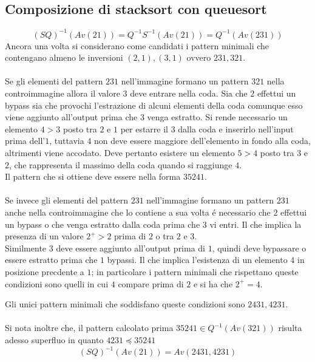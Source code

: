 \subsection*{Composizione di {stacksort} con {queuesort}}
$$(SQ)^{-1}(Av(21))=Q^{-1}S^{-1}(Av(21))=Q^{-1}(Av(231))$$Ancora una volta si considerano come candidati i pattern minimali che contengano almeno le inversioni $(2,1),(3,1)$ ovvero $231,321$.\\\\
Se gli elementi del pattern $231$ nell'immagine formano un pattern $321$ nella controimmagine allora il valore $3$ deve entrare nella coda. Sia che $2$ effettui un bypass sia che provochi l'estrazione di alcuni elementi della coda comunque esso viene aggiunto all'output prima che $3$ venga estratto. Si rende necessario un elemento $4>3$ posto tra $2$ e $1$ per estarre il $3$ dalla coda e inserirlo nell'input prima dell'$1$, tuttavia $4$ non deve essere maggiore dell'elemento in fondo alla coda, altrimenti viene accodato. Deve pertanto esistere un elemento $5>4$ posto tra $3$ e $2$, che rappresenta il massimo della coda quando si raggiunge $4$.\\
Il pattern che si ottiene deve essere nella forma $35241$.\\\\
Se invece gli elementi del pattern $231$ nell'immagine formano un pattern $231$ anche nella controimmagine che lo contiene a sua volta \'e necessario che $2$ effettui un bypass o che venga estratto dalla coda prima che $3$ vi entri. Il che implica la presenza di un valore $2^+>2$ prima di $2$ o tra $2$ e $3$.\\Similmente $3$ deve essere aggiunto all'output prima di $1$, quindi deve bypassare o essere estratto prima che $1$ bypassi. Il che implica l'esistenza di un elemento $4$ in posizione precdente a $1$; in particolare i pattern minimali che rispettano queste condizioni sono quelli in cui $4$ compare prima di $2$ e si ha che $2^+=4$.\\
\begin{center}
\end{center}
Gli unici pattern minimali che soddisfano queste condizioni sono $2431,4231$.
\\\\Si nota inoltre che, il pattern calcolato prima $35241\in Q^{-1}(Av(321))$ risulta adesso superfluo in quanto $4231\preceq35241$
$$(SQ)^{-1}(Av(21))=Av(2431,4231)$$
